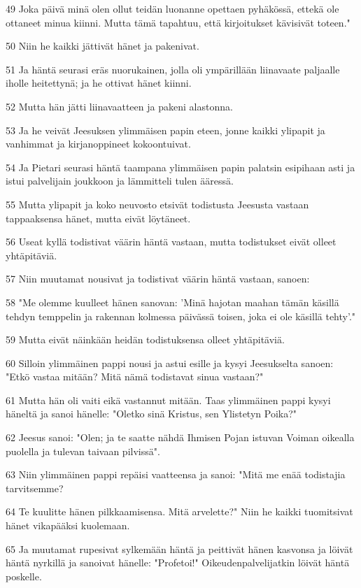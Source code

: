 \par 49 Joka päivä minä olen ollut teidän luonanne opettaen pyhäkössä, ettekä ole ottaneet minua kiinni. Mutta tämä tapahtuu, että kirjoitukset kävisivät toteen."
\par 50 Niin he kaikki jättivät hänet ja pakenivat.
\par 51 Ja häntä seurasi eräs nuorukainen, jolla oli ympärillään liinavaate paljaalle iholle heitettynä; ja he ottivat hänet kiinni.
\par 52 Mutta hän jätti liinavaatteen ja pakeni alastonna.
\par 53 Ja he veivät Jeesuksen ylimmäisen papin eteen, jonne kaikki ylipapit ja vanhimmat ja kirjanoppineet kokoontuivat.
\par 54 Ja Pietari seurasi häntä taampana ylimmäisen papin palatsin esipihaan asti ja istui palvelijain joukkoon ja lämmitteli tulen ääressä.
\par 55 Mutta ylipapit ja koko neuvosto etsivät todistusta Jeesusta vastaan tappaaksensa hänet, mutta eivät löytäneet.
\par 56 Useat kyllä todistivat väärin häntä vastaan, mutta todistukset eivät olleet yhtäpitäviä.
\par 57 Niin muutamat nousivat ja todistivat väärin häntä vastaan, sanoen:
\par 58 "Me olemme kuulleet hänen sanovan: 'Minä hajotan maahan tämän käsillä tehdyn temppelin ja rakennan kolmessa päivässä toisen, joka ei ole käsillä tehty'."
\par 59 Mutta eivät näinkään heidän todistuksensa olleet yhtäpitäviä.
\par 60 Silloin ylimmäinen pappi nousi ja astui esille ja kysyi Jeesukselta sanoen: "Etkö vastaa mitään? Mitä nämä todistavat sinua vastaan?"
\par 61 Mutta hän oli vaiti eikä vastannut mitään. Taas ylimmäinen pappi kysyi häneltä ja sanoi hänelle: "Oletko sinä Kristus, sen Ylistetyn Poika?"
\par 62 Jeesus sanoi: "Olen; ja te saatte nähdä Ihmisen Pojan istuvan Voiman oikealla puolella ja tulevan taivaan pilvissä".
\par 63 Niin ylimmäinen pappi repäisi vaatteensa ja sanoi: "Mitä me enää todistajia tarvitsemme?
\par 64 Te kuulitte hänen pilkkaamisensa. Mitä arvelette?" Niin he kaikki tuomitsivat hänet vikapääksi kuolemaan.
\par 65 Ja muutamat rupesivat sylkemään häntä ja peittivät hänen kasvonsa ja löivät häntä nyrkillä ja sanoivat hänelle: "Profetoi!" Oikeudenpalvelijatkin löivät häntä poskelle.
